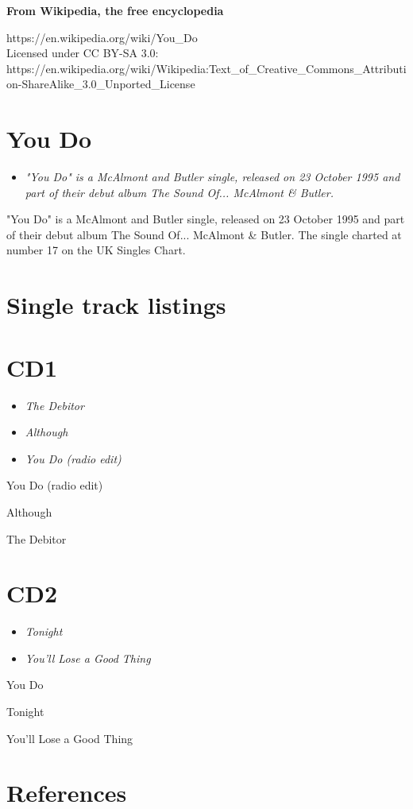 \textbf{From Wikipedia, the free encyclopedia}

https://en.wikipedia.org/wiki/You\_Do\\
Licensed under CC BY-SA 3.0:\\
https://en.wikipedia.org/wiki/Wikipedia:Text\_of\_Creative\_Commons\_Attribution-ShareAlike\_3.0\_Unported\_License

\section{You Do}\label{you-do}

\begin{itemize}
\item
  \emph{"You Do" is a McAlmont and Butler single, released on 23 October
  1995 and part of their debut album The Sound Of... McAlmont \&
  Butler.}
\end{itemize}

"You Do" is a McAlmont and Butler single, released on 23 October 1995
and part of their debut album The Sound Of... McAlmont \& Butler. The
single charted at number 17 on the UK Singles Chart.

\section{Single track listings}\label{single-track-listings}

\section{CD1}\label{cd1}

\begin{itemize}
\item
  \emph{The Debitor}
\item
  \emph{Although}
\item
  \emph{You Do (radio edit)}
\end{itemize}

You Do (radio edit)

Although

The Debitor

\section{CD2}\label{cd2}

\begin{itemize}
\item
  \emph{Tonight}
\item
  \emph{You'll Lose a Good Thing}
\end{itemize}

You Do

Tonight

You'll Lose a Good Thing

\section{References}\label{references}
